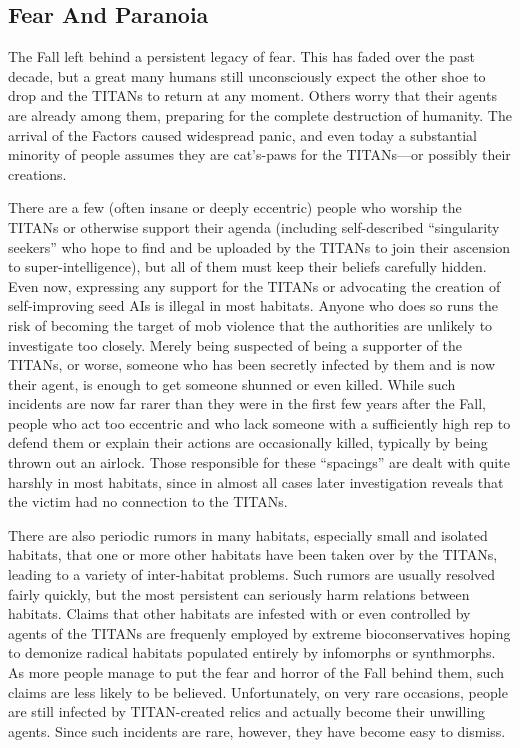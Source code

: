 \subsection{Fear And Paranoia}

The Fall left behind a persistent legacy of fear. This has 
faded over the past decade, but a great many humans 
still unconsciously expect the other shoe to drop and 
the TITANs to return at any moment. Others worry 
that their agents are already among them, preparing for 
the complete destruction of humanity. The arrival of 
the Factors caused widespread panic, and even today a 
substantial minority of people assumes they are cat's-paws
for the TITANs—or possibly their creations.

There are a few (often insane or deeply eccentric) 
people who worship the TITANs or otherwise support 
their agenda (including self-described ``singularity 
seekers'' who hope to find and be uploaded by the 
TITANs to join their ascension to super-intelligence), 
but all of them must keep their beliefs carefully hidden. 
Even now, expressing any support for the TITANs or 
advocating the creation of self-improving seed AIs 
is illegal in most habitats. Anyone who does so runs 
the risk of becoming the target of mob violence that 
the authorities are unlikely to investigate too closely. 
Merely being suspected of being a supporter of the 
TITANs, or worse, someone who has been secretly 
infected by them and is now their agent, is enough 
to get someone shunned or even killed. While such 
incidents are now far rarer than they were in the first 
few years after the Fall, people who act too eccentric 
and who lack someone with a sufficiently high rep to 
defend them or explain their actions are occasionally 
killed, typically by being thrown out an airlock. Those 
responsible for these ``spacings'' are dealt with quite 
harshly in most habitats, since in almost all cases later 
investigation reveals that the victim had no connection
to the TITANs.

There are also periodic rumors in many habitats, especially
small and isolated habitats, that one or more
other habitats have been taken over by the TITANs, 
leading to a variety of inter-habitat problems. Such 
rumors are usually resolved fairly quickly, but the 
most persistent can seriously harm relations between 
habitats. Claims that other habitats are infested with 
or even controlled by agents of the TITANs are frequenly
employed by extreme bioconservatives hoping
to demonize radical habitats populated entirely by infomorphs
or synthmorphs. As more people manage to
put the fear and horror of the Fall behind them, such 
claims are less likely to be believed. Unfortunately, 
on very rare occasions, people are still infected by 
TITAN-created relics and actually become their unwilling
agents. Since such incidents are rare, however,
they have become easy to dismiss.

